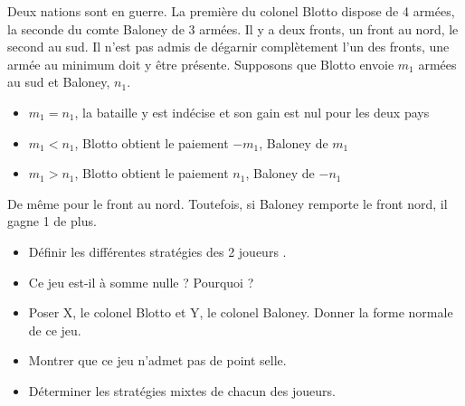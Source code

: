 \documentclass[12pt]{article}
\begin{document}
Deux nations sont en guerre. La premi\`ere du colonel Blotto dispose de 4 arm\'ees, la seconde du comte Baloney de 3 arm\'ees.
Il y a deux fronts, un front au nord, le second au sud. Il n'est pas admis de d\'egarnir compl\`etement l'un des fronts, 
une arm\'ee au minimum doit y \^etre pr\'esente. 
Supposons que Blotto envoie $m_1$ arm\'ees au sud et Baloney, $n_1$. 
\begin{itemize}
 \item $m_1=n_1$, la bataille y est ind\'ecise et son gain est nul pour les deux pays
 \item $m_1<n_1$, Blotto obtient le paiement $- m_1$, Baloney de $m_1$
 \item $m_1>n_1$, Blotto obtient le paiement $n_1$, Baloney de $-n_1$
\end{itemize}
De m\^eme pour le front au nord. Toutefois, si Baloney remporte le front nord, il gagne 1 de plus.\\

\begin{itemize}
\item D\'efinir les diff\'erentes strat\'egies des 2 \og joueurs \fg.
\item Ce jeu est-il \`a somme nulle ? Pourquoi ?
\item Poser X, le colonel Blotto et Y, le colonel Baloney. Donner la forme normale de ce jeu.
\item Montrer que ce jeu n'admet pas de point selle.
\item D\'eterminer les strat\'egies mixtes de chacun des joueurs.  
\end{itemize}
\end{document}
